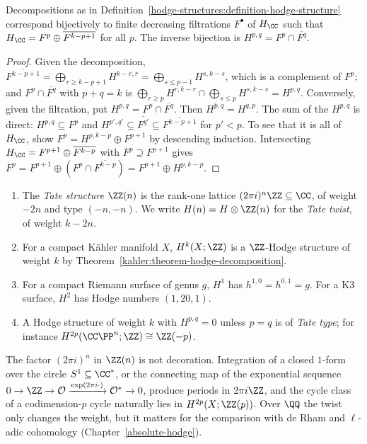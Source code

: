 \begin{proposition}\label{hodge-structures:proposition-filtration}
Decompositions as in Definition~\ref{hodge-structures:definition-hodge-structure} correspond bijectively to finite decreasing filtrations $F^\bullet$ of $H_\CC$ such that
$H_\CC = F^p \oplus \overline{F^{k-p+1}}$ for all $p$. The inverse bijection is $H^{p,q} = F^p \cap \overline{F^q}$.
\end{proposition}

\begin{proof}
Given the decomposition, $\overline{F^{k-p+1}} = \bigoplus_{r \geq k-p+1}H^{k-r,r} = \bigoplus_{s \leq p-1}H^{s,k-s}$, which is a complement of $F^p$; and $F^p \cap \overline{F^q}$ with $p + q = k$ is
$\bigoplus_{r \geq p}H^{r,k-r} \cap \bigoplus_{s \leq p}H^{s,k-s} = H^{p,q}$. Conversely, given the filtration, put $H^{p,q} = F^p \cap \overline{F^q}$. Then
$\overline{H^{p,q}} = H^{q,p}$. The sum of the $H^{p,q}$ is direct: $H^{p,q} \subseteq F^p$ and $H^{p',q'} \subseteq \overline{F^{q'}} \subseteq \overline{F^{k-p+1}}$ for $p' < p$. To see
that it is all of $H_\CC$, show $F^p = H^{p,k-p} \oplus F^{p+1}$ by descending induction. Intersecting $H_\CC = F^{p+1} \oplus \overline{F^{k-p}}$ with $F^p \supseteq F^{p+1}$ gives
$F^p = F^{p+1} \oplus (F^p \cap \overline{F^{k-p}}) = F^{p+1} \oplus H^{p,k-p}$.
\end{proof}

\begin{example}\label{hodge-structures:example-hodge-structures}
\begin{enumerate}
\item The \emph{Tate structure} $\ZZ(n)$ is the rank-one lattice $(2\pi i)^n\ZZ \subseteq \CC$, of weight $-2n$ and type $(-n, -n)$. We write $H(n) = H \otimes \ZZ(n)$ for the
\emph{Tate twist}, of weight $k - 2n$.
\item For a compact K\"ahler manifold $X$, $H^k(X; \ZZ)$ is a $\ZZ$-Hodge structure of weight $k$ by Theorem~\ref{kahler:theorem-hodge-decomposition}.
\item For a compact Riemann surface of genus $g$, $H^1$ has $h^{1,0} = h^{0,1} = g$. For a K3 surface, $H^2$ has Hodge numbers $(1, 20, 1)$.
\item A Hodge structure of weight $k$ with $H^{p,q} = 0$ unless $p = q$ is of \emph{Tate type}; for instance $H^{2p}(\CC\PP^n; \ZZ) \cong \ZZ(-p)$.
\end{enumerate}
\end{example}

\begin{remark}\label{hodge-structures:remark-tate-normalisation}
The factor $(2\pi i)^n$ in $\ZZ(n)$ is not decoration. Integration of a closed $1$-form over the circle $S^1 \subseteq \CC^*$, or the connecting map of the exponential sequence
$0 \to \ZZ \to \mathcal{O} \xrightarrow{\exp(2\pi i\cdot)} \mathcal{O}^* \to 0$, produce periods in $2\pi i\ZZ$, and the cycle class of a codimension-$p$ cycle naturally lies in
$H^{2p}(X; \ZZ(p))$. Over $\QQ$ the twist only changes the weight, but it matters for the comparison with de Rham and $\ell$-adic cohomology (Chapter~\ref{absolute-hodge}).
\end{remark}

